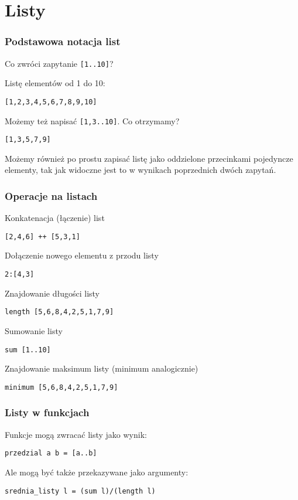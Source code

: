 \section{Listy}
\sectionframe

\begin{frame}
  \frametitle{Podstawowa notacja list}
  Co zwróci zapytanie \texttt{[1..10]}?
  \vspace{1em}
  \pause

  Listę elementów od 1 do 10:

  \texttt{[1,2,3,4,5,6,7,8,9,10]}
  \vspace{2em}
  \pause

  Możemy też napisać \texttt{[1,3..10]}. Co otrzymamy?
  \vspace{1em}
  \pause

  \texttt{[1,3,5,7,9]}
  \vspace{2em}
  \pause

  Możemy również po prostu zapisać listę jako oddzielone przecinkami
  pojedyncze elementy, tak jak widoczne jest to w wynikach poprzednich
  dwóch zapytań.
  
\end{frame}

\begin{frame}
  \frametitle{Operacje na listach}
  Konkatenacja (łączenie) list
  
  \texttt{[2,4,6] ++ [5,3,1]}
  \vspace{1em}
  \pause

  Dołączenie nowego elementu z przodu listy

  \texttt{2:[4,3]}
  \vspace{1em}
  \pause

  Znajdowanie długości listy

  \texttt{length [5,6,8,4,2,5,1,7,9]}
  \vspace{1em}
  \pause

  Sumowanie listy

  \texttt{sum [1..10]}
  \vspace{1em}
  \pause

  Znajdowanie maksimum listy (minimum analogicznie)

  \texttt{minimum [5,6,8,4,2,5,1,7,9]}
\end{frame}

\begin{frame}
  \frametitle{Listy w funkcjach}
  Funkcje mogą zwracać listy jako wynik:

  \texttt{przedzial a b = [a..b]}
  \vspace{1em}
  \pause

  Ale mogą być także przekazywane jako argumenty:

  \texttt{srednia\_listy l = (sum l)/(length l)}
\end{frame}

